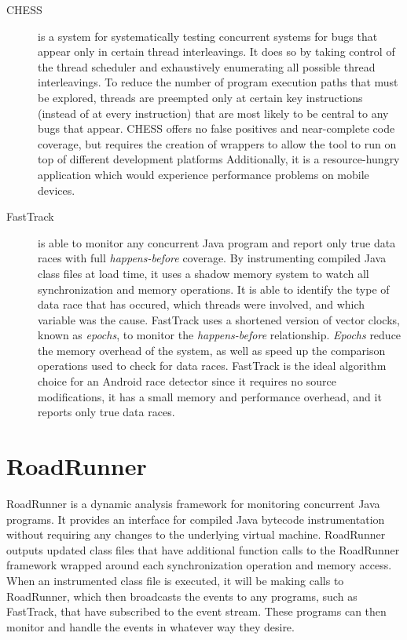 \documentclass{acm_proc_article-sp}
\begin{document}
\begin{description}
\item[CHESS] \cite{Musuvathi2008} is a system for systematically testing concurrent systems for bugs that appear only in certain thread interleavings. It does so by taking control of the thread scheduler and exhaustively enumerating all possible thread interleavings. To reduce the number of program execution paths that must be explored, threads are preempted only at certain key instructions (instead of at every instruction) that are most likely to be central to any bugs that appear. CHESS offers no false positives and near-complete code coverage, but requires the creation of wrappers to allow the tool to run on top of different development platforms  Additionally, it is a resource-hungry  application which would experience performance problems on mobile devices.


\item[FastTrack] \cite{Flanagan2009} is able to monitor any concurrent Java program and report only true data races with full \emph{happens-before} coverage. By instrumenting compiled Java class files at load time, it uses a shadow memory system to watch all synchronization and memory  operations. It is able to identify the type of data race that has occured, which threads were involved, and which variable was the cause.  FastTrack uses a shortened version of vector clocks, known as \emph{epochs}, to monitor the \emph{happens-before} relationship. \emph{Epochs} reduce the memory overhead of the system, as well as speed up the comparison operations used to check for data races. FastTrack is the ideal algorithm choice for an Android race detector since it requires no source modifications, it has a small memory and performance overhead, and it reports only true data races.
\end{description}

\section{RoadRunner}
RoadRunner is a dynamic analysis framework for monitoring concurrent Java programs. It provides an interface for compiled Java bytecode instrumentation without requiring any changes to the underlying virtual machine. RoadRunner outputs updated class files that have additional function calls to the RoadRunner framework wrapped around each synchronization operation and memory access. When an instrumented class file is executed, it will be making calls to RoadRunner, which then broadcasts the events to any programs, such as FastTrack, that have subscribed to the event stream. These programs can then monitor and handle the events in whatever way they desire.
\end{document}
